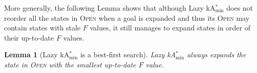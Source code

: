 \documentclass[twoside,11pt]{article}
\newtheorem{lemma}[theorem]{Lemma}
\newcommand{\kgs}{$k$GP\xspace}
\newcommand{\kastarvar}[1]{\textup{kA}$^*_{#1}$\xspace}
\newcommand{\kastarmin}{\kastarvar{\min}}
\newcommand{\open}{\textsc{Open}\xspace}
\begin{document}
More generally, the following Lemma shows that although Lazy \kastarmin does not reorder all the states in \open when a goal is expanded and thus its \open may contain states with stale $F$ values,
it still manages to expand states in order of their up-to-date $F$ values. %


\begin{lemma}[Lazy \kastarmin is a best-first search]
Lazy \kastarmin always expands the state in \open with the smallest up-to-date $F$ value. %
\label{the:lazy-minf-correct}
\end{lemma}
\end{document}
